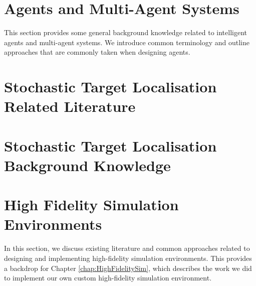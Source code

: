 \section{Agents and Multi-Agent Systems}
This section provides some general background knowledge related to intelligent agents and multi-agent systems. We introduce common terminology and outline approaches that are commonly taken when designing agents.


\section{Stochastic Target Localisation Related Literature}\label{sec:StochasticTargetLocalisationRelatedLiterature}


\section{Stochastic Target Localisation Background Knowledge}\label{sec:StochasticTargetLocalizationBackground}


\section{High Fidelity Simulation Environments}
In this section, we discuss existing literature and common approaches related to designing and implementing high-fidelity simulation environments. This provides a backdrop for Chapter \ref{chap:HighFidelitySim}, which describes the work we did to implement our own custom high-fidelity simulation environment.




%



